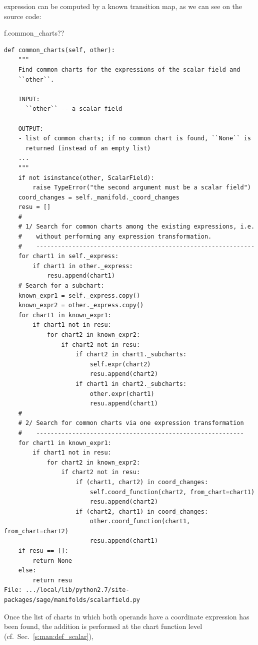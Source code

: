 expression can be computed by a known transition map, as we can see on the source
code:
\begin{NBin}
f.common_charts??
\end{NBin}
\begin{lstlisting}
def common_charts(self, other):
    """
    Find common charts for the expressions of the scalar field and
    ``other``.

    INPUT:
    - ``other`` -- a scalar field

    OUTPUT:
    - list of common charts; if no common chart is found, ``None`` is
      returned (instead of an empty list)
    ...
    """
    if not isinstance(other, ScalarField):
        raise TypeError("the second argument must be a scalar field")
    coord_changes = self._manifold._coord_changes
    resu = []
    #
    # 1/ Search for common charts among the existing expressions, i.e.
    #    without performing any expression transformation.
    #    -------------------------------------------------------------
    for chart1 in self._express:
        if chart1 in other._express:
            resu.append(chart1)
    # Search for a subchart:
    known_expr1 = self._express.copy()
    known_expr2 = other._express.copy()
    for chart1 in known_expr1:
        if chart1 not in resu:
            for chart2 in known_expr2:
                if chart2 not in resu:
                    if chart2 in chart1._subcharts:
                        self.expr(chart2)
                        resu.append(chart2)
                    if chart1 in chart2._subcharts:
                        other.expr(chart1)
                        resu.append(chart1)
    #
    # 2/ Search for common charts via one expression transformation
    #    ----------------------------------------------------------
    for chart1 in known_expr1:
        if chart1 not in resu:
            for chart2 in known_expr2:
                if chart2 not in resu:
                    if (chart1, chart2) in coord_changes:
                        self.coord_function(chart2, from_chart=chart1)
                        resu.append(chart2)
                    if (chart2, chart1) in coord_changes:
                        other.coord_function(chart1, from_chart=chart2)
                        resu.append(chart1)
    if resu == []:
        return None
    else:
        return resu
File: .../local/lib/python2.7/site-packages/sage/manifolds/scalarfield.py
\end{lstlisting}
Once the list of charts in which both operands have a coordinate expression
has been found,
the addition is performed at the chart function level (cf.\ Sec.~\ref{s:man:def_scalar}),
